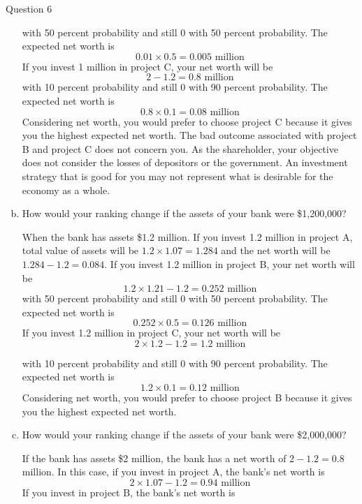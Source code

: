 \documentclass[a4paper]{article}
\newif\IfInSansMode
\numberwithin{equation}{section}
\numberwithin{figure}{section}
\begin{document}
\begin{questionbox}{Question 6}
\begin{enumerate}[(a)]
\begin{explanationbox}
\[				\]
				with 50 percent probability and still 0 with 50 percent probability. The expected net worth is
				\[
					0.01 \times 0.5 = 0.005 \text{ million}
				\]
				If you invest 1 million in project C, your net worth will be
				\[
					2-1.2 = 0.8 \text{ million}
				\]
				with 10 percent probability and still 0 with 90 percent probability. The expected net worth is
				\[
					0.8 \times 0.1 = 0.08 \text{ million}
				\]
				Considering net worth, you would prefer to choose project C because it gives you the highest expected net worth. The bad outcome associated with project B and project C does not concern you. As the shareholder, your objective does not consider the losses of depositors or the government. An investment strategy that is good for you may not represent what is desirable for the economy as a whole.
			\end{explanationbox}
			\item How would your ranking change if the assets of your bank were \$1,200,000?
			\begin{explanationbox}
				When the bank has assets \$1.2 million. If you invest 1.2 million in project A, total value of assets will be \( 1.2 \times 1.07 = 1.284 \) and the net worth will be \( 1.284 - 1.2 = 0.084 \). If you invest 1.2 million in project B, your net worth will be
				\[
					1.2 \times 1.21 - 1.2 = 0.252 \text{ million}
				\]
				with 50 percent probability and still 0 with 50 percent probability. The expected net worth is
				\[
					0.252 \times 0.5 = 0.126 \text{ million}
				\]
				If you invest 1.2 million in project C, your net worth will be
				\[
					2 \times 1.2 - 1.2 = 1.2 \text{ million}
				\]
			\end{explanationbox}
			\begin{explanationbox}
				with 10 percent probability and still 0 with 90 percent probability. The expected net worth is
				\[
					1.2 \times 0.1 = 0.12 \text{ million}
				\]
				Considering net worth, you would prefer to choose project B because it gives you the highest expected net worth.
			\end{explanationbox}
			\item How would your ranking change if the assets of your bank were \$2,000,000?
			\begin{explanationbox}
				If the bank has assets \$2 million, the bank has a net worth of \( 2 - 1.2 = 0.8 \) million. In this case, if you invest in project A, the bank's net worth is
				\[
					2 \times 1.07 - 1.2 = 0.94 \text{ million}
				\]
				If you invest in project B, the bank's net worth is

\end{explanationbox}
\end{enumerate}
\end{questionbox}
\end{document}
